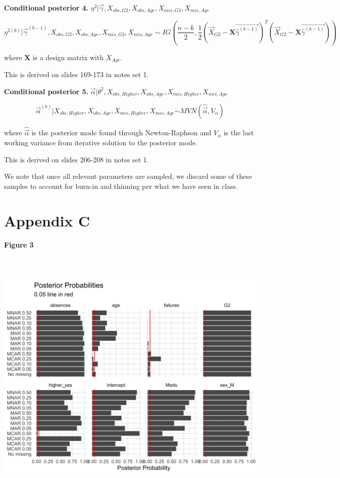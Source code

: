 \documentclass[11pt]{article}
\begin{document}
\vspace{0.25in}

\textbf{Conditional posterior 4.} $\eta^2|\vec{\gamma}, X_{obs, G2}, X_{obs, Age}, X_{mis, G2}, X_{mis, Age}$

$$\eta^{2(b)}|\vec{\gamma}^{(b - 1)}, X_{obs, G2}, X_{obs, Age}, X_{mis, G2}, X_{mis, Age} \sim IG\left(\frac{n - k}{2}, \frac{1}{2}(\vec{X}_{G2} - \mathbf{X}\vec{\hat\gamma^{(b - 1)}})^T(\vec{X}_{G2} - \mathbf{X}\vec{\hat\gamma^{(b - 1)}})\right)$$

where $\mathbf{X}$ is a design matrix with $X_{Age}$.

This is derived on slides 169-173 in notes set 1.

\vspace{0.25in}

\textbf{Conditional posterior 5.} $\vec\alpha| \theta^2, X_{obs, Higher}, X_{obs, Age}, X_{mis, Higher}, X_{mis, Age}$

$$\vec\alpha^{(b)}|  X_{obs, Higher}, X_{obs, Age}, X_{mis, Higher}, X_{mis, Age} \dot\sim MVN(\hat{\vec\alpha}, V_{\alpha})$$

where $\hat{\vec\alpha}$ is the posterior mode found through Newton-Raphson and $V_{\alpha}$ is the last working variance from iterative solution to the posterior mode.

This is derived on slides 206-208 in notes set 1.

We note that once all relevant parameters are sampled, we discard some of these samples to account for burn-in and thinning per what we have seen in class.

\newpage

\section{Appendix C}

\textbf{Figure 3}

\includegraphics[width=6.5in, height=5in]{posterior-probabilities-1}
\end{document}
